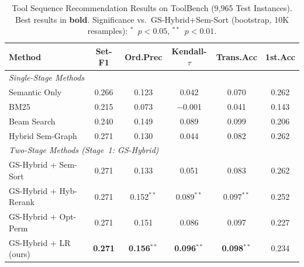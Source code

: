 \begin{table}[!t]
\caption{Tool Sequence Recommendation Results on ToolBench (9,965 Test Instances).
Best results in \textbf{bold}.
Significance vs.\ GS-Hybrid+Sem-Sort (bootstrap, 10K resamples):
$^{*}$~$p{<}0.05$, $^{**}$~$p{<}0.01$.}
\label{tab:main}
\centering
\small
\begin{tabular}{lccccc}
\toprule
\textbf{Method} & \textbf{Set-F1} & \textbf{Ord.Prec} & \textbf{Kendall-$\tau$} & \textbf{Trans.Acc} & \textbf{1st.Acc} \\
\midrule
\multicolumn{6}{l}{\textit{Single-Stage Methods}} \\
Semantic Only         & 0.266 & 0.123 & 0.042 & 0.070 & 0.262 \\
BM25                  & 0.215 & 0.073 & $-$0.001 & 0.041 & 0.143 \\
Beam Search           & 0.240 & 0.149 & 0.089 & 0.099 & 0.206 \\
Hybrid Sem-Graph      & 0.271 & 0.130 & 0.044 & 0.082 & 0.262 \\
\midrule
\multicolumn{6}{l}{\textit{Two-Stage Methods (Stage~1: GS-Hybrid)}} \\
GS-Hybrid + Sem-Sort              & 0.271 & 0.133 & 0.051 & 0.083 & 0.262 \\
GS-Hybrid + Hyb-Rerank            & 0.271 & 0.152$^{**}$ & 0.089$^{**}$ & 0.097$^{**}$ & 0.252 \\
GS-Hybrid + Opt-Perm              & 0.271 & 0.151 & 0.086 & 0.097 & 0.227 \\
GS-Hybrid + LR (ours)             & \textbf{0.271} & \textbf{0.156}$^{**}$ & \textbf{0.096}$^{**}$ & \textbf{0.098}$^{**}$ & 0.234 \\
\bottomrule
\end{tabular}
\end{table}
